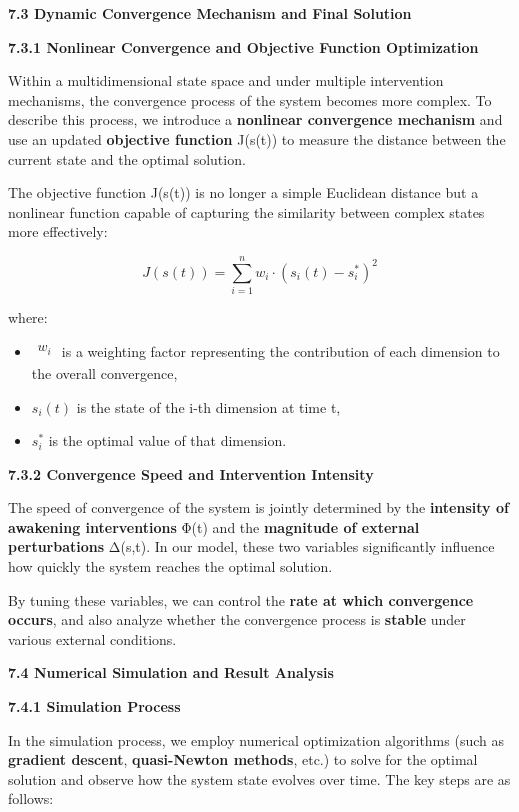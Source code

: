 \documentclass[
]{article}
\begin{document}
\textbf{7.3 Dynamic Convergence Mechanism and Final Solution}

\textbf{7.3.1 Nonlinear Convergence and Objective Function Optimization}

Within a multidimensional state space and under multiple intervention
mechanisms, the convergence process of the system becomes more complex.
To describe this process, we introduce a \textbf{nonlinear convergence
mechanism} and use an updated \textbf{objective function} J(s(t)) to
measure the distance between the current state and the optimal solution.

The objective function J(s(t)) is no longer a simple Euclidean distance
but a nonlinear function capable of capturing the similarity between
complex states more effectively:

\[J\left( s(t) \right) = \sum_{i = 1}^{n}w_{i} \cdot \left( s_{i}(t) - s_{i}^{*} \right)^{2}\]

where:

\begin{itemize}
\item
  \(\begin{matrix}
  w_{i} \\
  \end{matrix}\) is a weighting factor representing the contribution of
  each dimension to the overall convergence,
\item
  \(s_{i}(t)\) is the state of the i-th dimension at time t,
\item
  \(s_{i}^{*}\)\hspace{0pt} is the optimal value of that dimension.
\end{itemize}

\textbf{7.3.2 Convergence Speed and Intervention Intensity}

The speed of convergence of the system is jointly determined by the
\textbf{intensity of awakening interventions} Φ(t) and the
\textbf{magnitude of external perturbations} Δ(s,t). In our model, these
two variables significantly influence how quickly the system reaches the
optimal solution.

By tuning these variables, we can control the \textbf{rate at which
convergence occurs}, and also analyze whether the convergence process is
\textbf{stable} under various external conditions.

\textbf{7.4 Numerical Simulation and Result Analysis}

\textbf{7.4.1 Simulation Process}

In the simulation process, we employ numerical optimization algorithms
(such as \textbf{gradient descent}, \textbf{quasi-Newton methods}, etc.)
to solve for the optimal solution and observe how the system state
evolves over time. The key steps are as follows:
\end{document}
